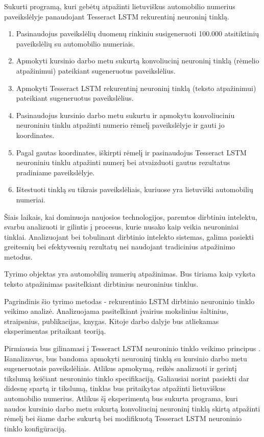 \documentclass{VUMIFInfBakalaurinis}
\begin{document}
Sukurti programą, kuri gebėtų atpažinti lietuviškus automobilio numerius paveikslėlyje panaudojant Tesseract LSTM rekurentinį neuroninį tinklą.

\begin{enumerate}
  \item Pasinaudojus paveikslėlių duomenų rinkiniu susigeneruoti 100.000 atsitiktinių paveikslėlių su automobilio numeriais.
  \item Apmokyti kursinio darbo metu sukurtą konvoliucinį neuroninį tinklą (rėmelio atpažinimui) pateikiant sugeneruotus paveikslėlius.
  \item Apmokyti Tesseract LSTM rekurentinį neuroninį tinklą (teksto atpažinimui) pateikiant sugeneruotus paveikslėlius.
  \item Pasinaudojus kursinio darbo metu sukurtu ir apmokytu konvoliuciniu neuroniniu tinklu atpažinti numerio rėmelį paveikslėlyje ir gauti jo koordinates.
  \item Pagal gautas koordinates, iškirpti rėmelį ir pasinaudojus Tesseract LSTM neuroniniu tinklu atpažinti numerį bei atvaizduoti gautus rezultatus pradiniame paveikslėlyje.
  \item Ištestuoti tinklą su tikrais paveikslėliais, kuriuose yra lietuviški automobilių numeriai.
\end{enumerate}

Šiais laikais, kai dominuoja naujosios technologijos, paremtos dirbtiniu intelektu, svarbu
analizuoti ir gilintis į procesus, kurie nusako kaip veikia neuroniniai tinklai. Analizuojant bei 
tobulinant dirbtinio intelekto sistemas, galima pasiekti greitesnių bei efektyvesnių rezultatų nei
naudojant tradicinius atpažinimo metodus.

Tyrimo objektas yra automobilių numerių atpažinimas. Bus tiriama kaip vyksta teksto atpažinimas pasitelkiant dirbtinius neuroninius tinklus.

Pagrindinis šio tyrimo metodas - rekurentinio LSTM dirbtinio neuroninio tinklo veikimo
analizė. Analizuojama pasitelkiant įvairius mokslinius šaltinius, straipsnius, publikacijas, knygas.
Kitoje darbo dalyje bus atliekamas eksperimentas pritaikant teoriją.

Pirmiausia bus gilinamasi į Tesseract LSTM neuroninio tinklo veikimo principus \cite{bhushan2013license}.
Išanalizavus, bus bandoma apmokyti neuroninį tinklą su kursinio darbo metu sugeneruotais 
paveikslėliais. Atlikus apmokymą, reikės analizuoti ir gerintį tikslumą keičiant neuroninio tinklo
specifikaciją. Galiausiai norint pasiekti dar didesnę spartą ir tikslumą, tinklas bus pritaikytas 
atpažinti lietuviškus automobilio numerius. Atlikus šį eksperimentą bus sukurta programa, kuri
naudos kursinio darbo metu sukurtą konvoliucinį neuroninį tinklą skirtą atpažinti rėmelį bei šiame
darbe sukurtą bei modifikuotą Tesseract LSTM neuroninio tinklo konfigūraciją.
\end{document}
